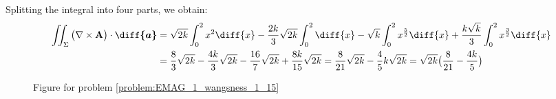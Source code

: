 \begin{solution}
                Splitting the integral into four parts, we obtain:
                \begin{align}
                    \iint_{\Sigma}\big(\nabla\times\mathbf{A}\big)
                        \cdot\boldsymbol{\diff{a}}
                    &=\sqrt{2k}\int_{0}^{2}x^{2}\diff{x}
                     -\frac{2k}{3}\sqrt{2k}
                    \int_{0}^{2}\diff{x}
                    -\sqrt{k}\int_{0}^{2}x^{\frac{5}{2}}\diff{x}
                    +\frac{k\sqrt{k}}{3}
                     \int_{0}^{2}x^{\frac{3}{2}}\diff{x}\\
                    &=\frac{8}{3}\sqrt{2k}
                     -\frac{4k}{3}\sqrt{2k}-\frac{16}{7}\sqrt{2k}
                     +\frac{8k}{15}\sqrt{2k}
                     =\frac{8}{21}\sqrt{2k}-\frac{4}{5}k\sqrt{2k}
                     =\sqrt{2k}\big(\frac{8}{21}-\frac{4k}{5}\big)
                \end{align}
            \end{solution}
            \begin{figure}[H]
                \centering
                \captionsetup{type=figure}
                
                \caption[Figure for Wangsness 1-15]
                {Figure for problem \ref{problem:EMAG_1_wangsness_1_15}}
                \label{fig:EMAG_1_wangsness_1_15}
            \end{figure}
